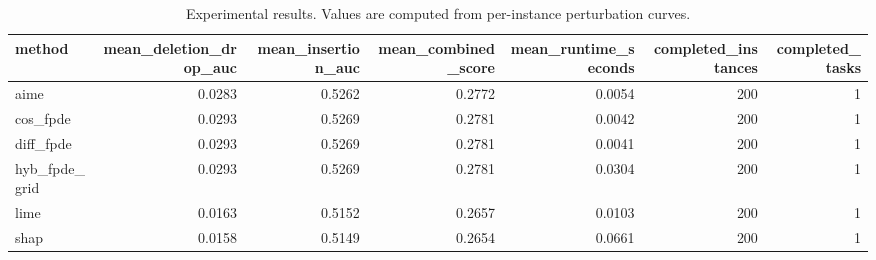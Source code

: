 \begin{table}[t]
\caption{Experimental results. Values are computed from per-instance perturbation curves.}
\label{tab:main_results_computed}
\centering
\begin{tabular}{lrrrrrr}
\toprule
method & mean\_deletion\_drop\_auc & mean\_insertion\_auc & mean\_combined\_score & mean\_runtime\_seconds & completed\_instances & completed\_tasks \\
\midrule
aime & 0.0283 & 0.5262 & 0.2772 & 0.0054 & 200 & 1 \\
cos\_fpde & 0.0293 & 0.5269 & 0.2781 & 0.0042 & 200 & 1 \\
diff\_fpde & 0.0293 & 0.5269 & 0.2781 & 0.0041 & 200 & 1 \\
hyb\_fpde\_grid & 0.0293 & 0.5269 & 0.2781 & 0.0304 & 200 & 1 \\
lime & 0.0163 & 0.5152 & 0.2657 & 0.0103 & 200 & 1 \\
shap & 0.0158 & 0.5149 & 0.2654 & 0.0661 & 200 & 1 \\
\bottomrule
\end{tabular}

\end{table}
